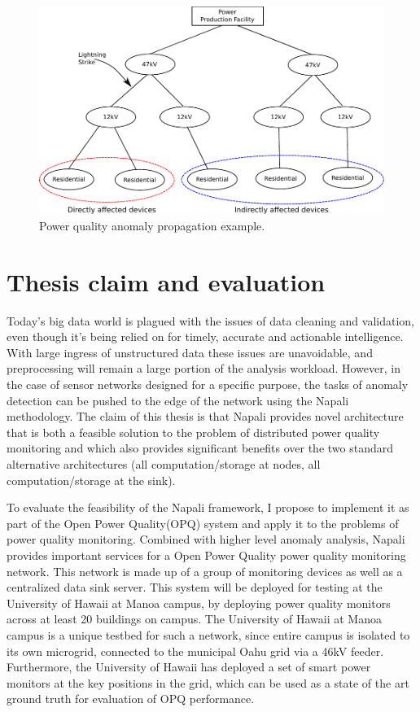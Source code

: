 \begin{figure}[h]
	\centering
	  \includegraphics[width=0.9\linewidth]{img/grid_hierarchy_cartoon.pdf}
	  \caption{Power quality anomaly propagation example.}
	  \label{intro:fig2}
\end{figure}

\section{Thesis claim and evaluation} \label{intro:sec:claim}

Today's big data world is plagued with the issues of data cleaning and validation, even though it's being relied on for timely, accurate and actionable intelligence.
With large ingress of unstructured data these issues are unavoidable, and preprocessing will remain a large portion of the analysis workload.
However, in the case of sensor networks designed for a specific purpose, the tasks of anomaly detection can be pushed to the edge of the network using the Napali methodology.
The claim of this thesis is that Napali provides novel architecture that is both a feasible solution to the problem of distributed power quality monitoring and which also provides significant benefits over the two standard alternative architectures (all computation/storage at nodes, all computation/storage at the sink).

To evaluate the feasibility of the Napali framework, I propose to implement it as part of the Open Power Quality(OPQ) system and apply it to the problems of power quality monitoring.
Combined with higher level anomaly analysis, Napali provides important services for a Open Power Quality power quality monitoring network.
This network is made up of a group of monitoring devices as well as a centralized data sink server.
This system will be deployed for testing at the University of Hawaii at Manoa campus, by deploying power quality monitors across at least 20 buildings on campus.
The University of Hawaii at Manoa campus is a unique testbed for such a network, since entire campus is isolated to its own microgrid, connected to the municipal Oahu grid via a 46kV feeder.
Furthermore, the University of Hawaii has deployed a set of smart power monitors at the key positions in the grid, which can be used as a state of the art ground truth for evaluation of OPQ performance.



